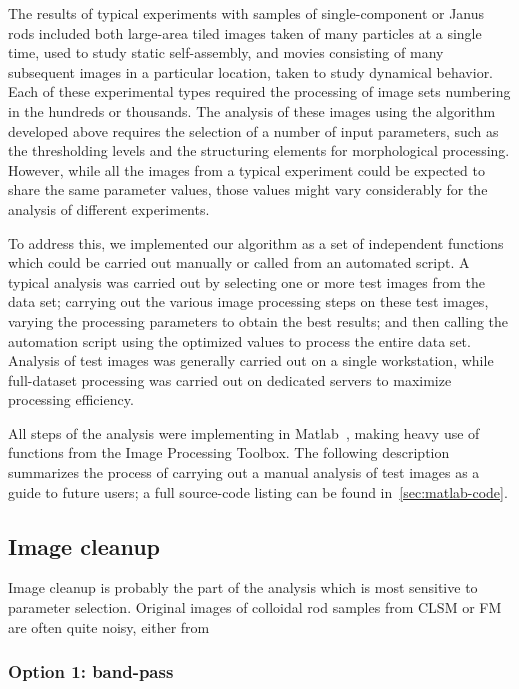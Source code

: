 The results of typical experiments with samples of single-component or Janus rods included both 
large-area tiled images taken of many particles at a single time,
used to study static self-assembly, and movies consisting of many subsequent images in a 
particular location, taken to study dynamical behavior.  Each of these experimental types required the processing
of image sets numbering in the hundreds or thousands.  The analysis of these images using the algorithm developed
above requires the selection of a number of input parameters, such as the thresholding levels and the 
structuring elements for morphological processing.  However, while all the images from a typical
experiment could be expected to share the same parameter values, those values might vary considerably for the 
analysis of different
experiments.

To address this, we implemented our algorithm as a set of independent functions which could be carried out manually 
or called from an automated script. A typical analysis was carried out by selecting one or more 
test images from the data set; carrying out the various image processing steps on these test images, varying
the processing parameters to obtain the best results; and then calling the automation script using the 
optimized values to process the entire data set.  Analysis of test images was generally carried out on a single
workstation, while full-dataset processing was carried out on dedicated servers to maximize processing efficiency.

All steps of the analysis were implementing in Matlab~\cite{matlab}, making heavy use of functions from the
Image Processing Toolbox.  The following description summarizes the process of carrying out a manual analysis of
test images as a guide to future users; a full source-code listing can be found in~\ref{sec:matlab-code}.

\subsection{Image cleanup}

Image cleanup is probably the part of the analysis which is most sensitive to parameter selection.
Original images of colloidal rod samples from CLSM or FM are often quite noisy, either from 

\subsubsection{Option 1: band-pass}

